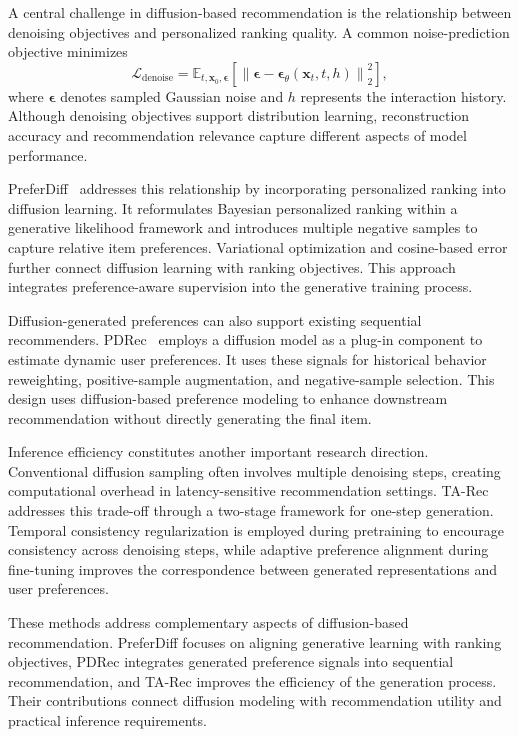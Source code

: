 \documentclass[sigconf,nonacm]{acmart}
\begin{document}
A central challenge in diffusion-based recommendation
is the relationship between denoising objectives
and personalized ranking quality. A common
noise-prediction objective minimizes
\begin{equation}
    \mathcal{L}_{\mathrm{denoise}}
    =
    \mathbb{E}_{t,\mathbf{x}_0,\boldsymbol{\epsilon}}
    \left[
    \left\|
    \boldsymbol{\epsilon}
    -
    \boldsymbol{\epsilon}_{\theta}
    (\mathbf{x}_t,t,h)
    \right\|_2^2
    \right],
    \label{eq:diffusion_denoise}
\end{equation}
where $\boldsymbol{\epsilon}$ denotes sampled
Gaussian noise and $h$ represents the
interaction history. Although denoising
objectives support distribution learning,
reconstruction accuracy and recommendation
relevance capture different aspects of
model performance.

PreferDiff~\cite{preferdiff} addresses this
relationship by incorporating personalized
ranking into diffusion learning. It reformulates
Bayesian personalized ranking within a
generative likelihood framework and introduces
multiple negative samples to capture relative
item preferences. Variational optimization
and cosine-based error further connect
diffusion learning with ranking objectives.
This approach integrates preference-aware
supervision into the generative training
process.

Diffusion-generated preferences can also
support existing sequential recommenders.
PDRec~\cite{pdrec} employs a diffusion model
as a plug-in component to estimate dynamic
user preferences. It uses these signals
for historical behavior reweighting,
positive-sample augmentation, and
negative-sample selection. This design
uses diffusion-based preference modeling to
enhance downstream recommendation
without directly generating the final item.

Inference efficiency constitutes another
important research direction. Conventional
diffusion sampling often involves multiple
denoising steps, creating computational
overhead in latency-sensitive recommendation
settings. TA-Rec~\cite{tarec} addresses this
trade-off through a two-stage framework
for one-step generation. Temporal consistency
regularization is employed during pretraining
to encourage consistency across denoising
steps, while adaptive preference alignment
during fine-tuning improves the correspondence
between generated representations and user
preferences.

These methods address complementary aspects
of diffusion-based recommendation.
PreferDiff focuses on aligning generative
learning with ranking objectives, PDRec
integrates generated preference signals
into sequential recommendation, and TA-Rec
improves the efficiency of the generation
process. Their contributions connect
diffusion modeling with recommendation
utility and practical inference requirements.
\end{document}
